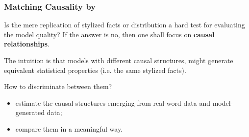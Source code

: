 \documentclass[10pt]{beamer}
\begin{document}
\begin{frame}[c]\frametitle{Matching Causality by \citet{guerini2017validation}}
	Is the mere replication of stylized facts or distribution a hard test for evaluating the model quality? If the answer is no, then one shall focus on \alert{\textbf{causal relationships}}. \bigskip
	
	The intuition is that models with different causal structures, might generate equivalent statistical properties (i.e. the same stylized facts).

	How to discriminate between them?
	\begin{itemize}
		\item estimate the causal structures emerging from real-word data and model-generated data;
		\item compare them in a meaningful way.
	\end{itemize} 
\end{frame}
\end{document}
